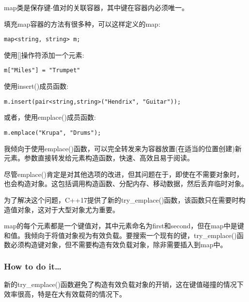 
map类是保存键-值对的关联容器，其中键在容器内必须唯一。

填充map容器的方法有很多种，可以这样定义的map:

\begin{lstlisting}[style=styleCXX]
map<string, string> m;
\end{lstlisting}

使用[]操作符添加一个元素:

\begin{lstlisting}[style=styleCXX]
m["Miles"] = "Trumpet"
\end{lstlisting}

使用insert()成员函数:

\begin{lstlisting}[style=styleCXX]
m.insert(pair<string,string>("Hendrix", "Guitar"));
\end{lstlisting}

或者，使用emplace()成员函数:

\begin{lstlisting}[style=styleCXX]
m.emplace("Krupa", "Drums");
\end{lstlisting}

我倾向于使用emplace()函数，可以完全转发来为容器放置(在适当的位置创建)新元素。参数直接转发给元素构造函数，快速、高效且易于阅读。
 
尽管emplace()肯定是对其他选项的改进，但其问题在于，即使在不需要对象时，也会构造对象。这包括调用构造函数、分配内存、移动数据，然后丢弃临时对象。

为了解决这个问题，C++17提供了新的try\_emplace()函数，该函数只在需要时构造值对象，这对于大型对象尤为重要。

\begin{tcolorbox}[colback=webgreen!5!white,colframe=webgreen!75!black,title=Note]
map的每个元素都是一个键值对，其中元素命名为first和second，但在map中是键和值。我倾向于将值对象视为有效负载。要搜索一个现有的键，try\_emplace()函数必须构造键对象，但不需要构造有效负载对象，除非需要插入到map中。
\end{tcolorbox}

\subsubsection{How to do it…}

新的try\_emplace()函数避免了构造有效负载对象的开销，这在键值碰撞的情况下效率很高，特是在大有效载荷的情况下。

